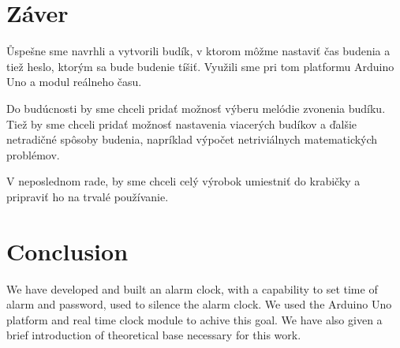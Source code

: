 \chapter*{Záver}
Ůspešne sme navrhli a vytvorili budík, v ktorom môžme nastaviť čas budenia a tiež heslo, ktorým sa bude budenie tíšiť. Využili sme pri tom platformu Arduino Uno a modul reálneho času.

Do budúcnosti by sme chceli pridať možnosť výberu melódie zvonenia budíku. Tiež by sme chceli pridať možnosť nastavenia viacerých budíkov a ďalšie netradičné spôsoby budenia, napríklad výpočet netriviálnych matematických problémov.

V neposlednom rade, by sme chceli celý výrobok umiestniť do krabičky a pripraviť ho na trvalé používanie.

\begingroup
\vspace{20mm}
\let\clearpage\relax
\chapter*{Conclusion}
\endgroup
We have developed and built an alarm clock, with a capability to set time of alarm and password, used to silence the alarm clock. We used the Arduino Uno platform and real time clock module to achive this goal. We have also given a brief introduction of theoretical base necessary for this work.

\newpage
